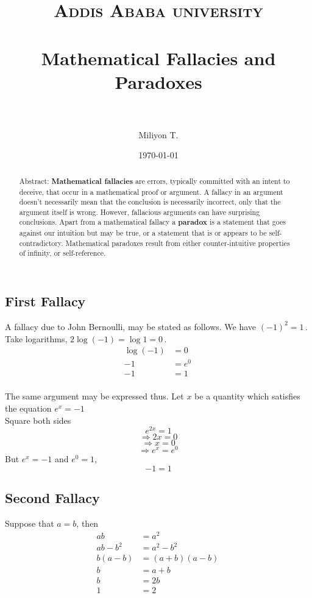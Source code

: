 \documentclass[paper=a4, fontsize=12pt]{scrartcl} %
\title{	
\normalfont \normalsize
\textsc{Addis Ababa university} \\ [25pt] %
\horrule{0.5pt} \\[0.4cm] %
\huge Mathematical Fallacies and Paradoxes \\ %
\horrule{2pt} \\[0.5cm] %
}
\author{Miliyon T.} %
\date{\normalsize\today} %
\theoremstyle{definition}
\theoremstyle{remark}
\begin{document}
\maketitle %
\begin{abstract}{Abstract: }
  \textbf{Mathematical fallacies} are errors, typically committed with an intent to deceive, that occur in a mathematical proof or argument. A fallacy in an argument doesn't necessarily mean that the conclusion is necessarily incorrect, only that the argument itself is wrong. However, fallacious arguments can have surprising conclusions. Apart from a mathematical fallacy a \textbf{paradox} is a statement that goes against our intuition but may be true, or a statement that is or appears to be self-contradictory. Mathematical paradoxes result from either counter-intuitive properties of infinity, or self-reference.
\end{abstract}

\subsection*{\textbf{First Fallacy}}
A fallacy due to John Bernoulli, may be stated as follows.
We have  $(-1)^2 = 1\,.  $
Take logarithms,  $2 \log(-1) = \log 1 = 0\,.$
\begin{align*}
   \log(-1) &= 0\, \\
         -1 &= e^0\,\\
         -1 &= 1\,\\
\end{align*}

The same argument may be expressed thus. Let $x$ be a quantity which satisfies the equation
$e^x = -1$\\
Square both sides
  $$ e^{2x} = 1$$
  $$\Rightarrow 2x = 0$$
  $$\Rightarrow x = 0$$
  $$\Rightarrow e^x = e^0$$
But $e^x = -1$ and $e^0 = 1$,\\
$$  -1 = 1$$

\subsection*{\textbf{Second Fallacy}}
Suppose that $a = b$, then
\begin{align*}
ab & =  a^2\, \\
  ab-b^2 & =  a^2 - b^2\, \\
 b(a-b) & =  (a+b)(a-b)\, \\
 b & =  a + b\, \\
  b & =  2b\,\\
 1 & =  2\,
\end{align*}
\end{document}
